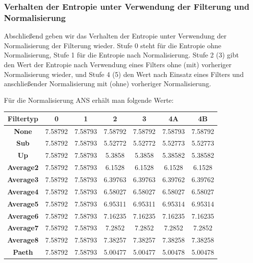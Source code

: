 \documentclass[a4paper,12pt]{article}
\begin{document}
\subsubsection{Verhalten der Entropie unter Verwendung der Filterung und Normalisierung}
Abschließend geben wir das Verhalten der Entropie unter Verwendung der Normalisierung der Filterung wieder. Stufe 0 steht für die Entropie ohne Normalisierung, Stufe 1 für die Entropie nach Normalisierung. Stufe 2 (3) gibt den Wert der Entropie nach Verwendung eines Filters ohne (mit) vorheriger Normalisierung wieder,  und Stufe 4 (5) den Wert nach Einsatz eines Filters und anschließender Normalisierung mit (ohne) vorheriger Normalisierung. 
\par
Für die Normalisierung ANS erhält man folgende Werte:
\par
\vspace{1cm}
\begin{tabular}{c | c | c | c | c | c | c}
Filtertyp & 0 &  1 & 2 & 3 & 4A & 4B
\\
\hline
\textbf{None} &  7.58792 & 7.58793 & 7.58792 & 7.58792  & 7.58793 &  7.58792
\\
\textbf{Sub} & 7.58792 &   7.58793 & 5.52772 &  5.52772 &5.52773  & 5.52773 
\\
\textbf{Up} & 7.58792 &  7.58793 & 5.3858 & 5.3858  & 5.38582 & 5.38582 
\\
\textbf{Average2} & 7.58792 &  7.58793 & 6.1528 & 6.1528 & 6.1528 & 6.1528 
\\
\textbf{Average3} & 7.58792 &  7.58793 & 6.39763 & 6.39763 & 6.39762 & 6.39762 
\\
\textbf{Average4} & 7.58792 &  7.58793 & 6.58027 & 6.58027 & 6.58027 & 6.58027 
\\
\textbf{Average5} & 7.58792 &  7.58793 & 6.95311 & 6.95311 & 6.95314 & 6.95314 
\\
\textbf{Average6} & 7.58792 &  7.58793 & 7.16235 & 7.16235 & 7.16235 &  7.16235 
\\
\textbf{Average7} & 7.58792 &  7.58793 & 7.2852 &  7.2852 &  7.2852 & 7.2852 
\\
\textbf{Average8} & 7.58792 &  7.58793 & 7.38257 & 7.38257  & 7.38258 & 7.38258 
\\
\textbf{Paeth} & 7.58792 &  7.58793 & 5.00477 &  5.00477  &  5.00478 & 5.00478 
\end{tabular}
\par
\vspace{1cm}
\end{document}
